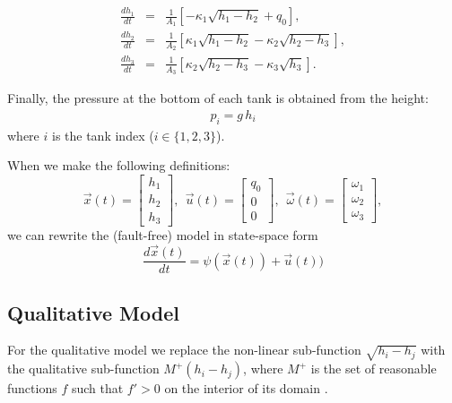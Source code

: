 \begin{eqnarray}
\frac{d h_1}{dt} & = & \frac{1}{A_1}\left[  - \kappa_1 \sqrt{h_1 - h_2} + q_0 \right],    \label{eq:ode1} \\
\frac{d h_2}{dt} &  = & \frac{1}{A_2}\left[   \kappa_{1} \sqrt{h_{1}-h_{2}} - \kappa_2 \sqrt{h_2-h_3}\right],\\
\frac{d h_3}{dt} & = & \frac{1}{A_3}\left[   \kappa_{2} \sqrt{h_2-h_3} - \kappa_3 \sqrt{h_3}\right].
\end{eqnarray}


Finally, the pressure at the bottom of each tank is obtained from the height:
\begin{eqnarray}\label{eq:pressure}
p_i = g\,h_i  
\end{eqnarray}
where $i$ is the tank index ($i \in \{1, 2, 3\}$).

When we make the following definitions:
\begin{equation}
\vec{x}(t) = \left[ \begin{array}{c}
h_1 \\ h_2 \\ h_3 \end{array}
\right],
~~ \vec{u}(t)  = \left[ \begin{array}{c}
q_0 \\ 0 \\ 0 \end{array}
\right],
~~ \vec{\omega}(t) = \left[ \begin{array}{c}
\omega_1 \\ \omega_2 \\ \omega_3 \end{array}
\right],
\end{equation}
we can rewrite the (fault-free) model in state-space form
\begin{equation}\label{state-space}
\frac{d \vec{x}(t)}{dt} = \psi (\vec{x}(t)) + \vec{u}(t)) 
\end{equation}




\subsection{Qualitative Model}

For the qualitative model we replace the non-linear sub-function
$ \sqrt{h_i - h_j}$ with the qualitative sub-function $M^+(h_i - h_j)$,
where $M^+$ is the set of reasonable functions $f$ such that $f' > 0$ on the interior of its domain \citep{kuipers1994composition}.


